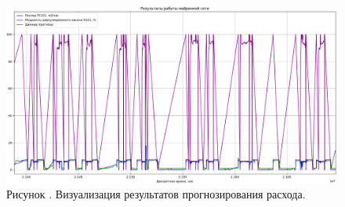{  \begin{figure}
    \centering
    \def\svgwidth{\textwidth}
    \includegraphics[scale=\textheight]{images/FE101test.png}
    \caption*{\gostFont Рисунок \thechaptercntr .\theimagecntr \spc {--} Визуализация результатов прогнозирования расхода.}
    \label{fig:Data1VisualAnomaly}
  \end{figure} \addtocounter{imagecntr}{1}

}

\setcounter{subchaptercntr}{1}
\setcounter{formulacntr}{1}
\setcounter{imagecntr}{1}
